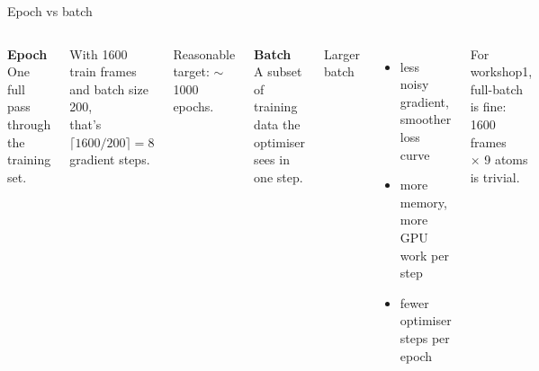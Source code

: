 \documentclass[aspectratio=169,11pt]{beamer}
\begin{document}
\begin{frame}{Epoch vs batch}
  \begin{columns}[T]
      \textbf{Epoch} \\
      One full pass through the training set.

      \vspace{0.4em}
      With 1600 train frames and batch size 200, \\
      that's $\lceil 1600 / 200 \rceil = 8$ gradient steps.

      \vspace{0.6em}
      Reasonable target: $\sim$1000 epochs.

      \textbf{Batch} \\
      A subset of training data the optimiser sees in one step.

      \vspace{0.4em}
      Larger batch
      \begin{itemize}
        \item less noisy gradient, smoother loss curve
        \item more memory, more GPU work per step
        \item fewer optimiser steps per epoch
      \end{itemize}

      For workshop1, full-batch is fine: 1600 frames \\
      $\times$ 9 atoms is trivial.
  \end{columns}

  \vspace{0.8em}
  \centering
\end{frame}
\end{document}
